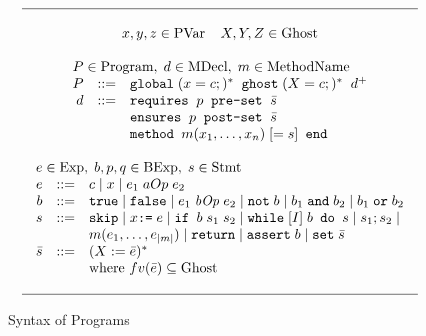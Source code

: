 \begin{figure}[tbp]
\begin{displaymath}
\begin{array}{c}
\hline
\ \\
x,y,z \in \textrm{PVar}\;\;\;\; X,Y,Z \in \textrm{Ghost} \\
\ \\
\begin{array}{rcl}
\multicolumn{3}{l}{P \in  \textrm{Program},\;d  \in  \textrm{MDecl},\;m  \in  \textrm{MethodName}}   \\
P & ::= & \texttt{global}\;(x = c;)^*  \;\; \texttt{ghost}\;(X = c;)^* \;\;  d^{+}  \\
d & ::= & \texttt{requires}\;\; p \;\; \texttt{pre-set}\;\; \bar{s}   \\
  &     & \texttt{ensures}\;\; p \;\; \texttt{post-set}\;\; \bar{s} \\
& & \texttt{method } m\textrm{(}x_1,\ldots,x_n)\; [= s] \texttt{ end} 
\end{array} \\
\ \\
\begin{array}{rcl}
\multicolumn{3}{l}{e  \in \textrm{Exp},\; b,p,q  \in  \textrm{BExp},\;s  \in  \textrm{Stmt}  } \\
e & ::= & c \mid x \mid e_1 \;aOp\; e_2     \\  
b & ::= & \texttt{true} \mid \texttt{false} \mid e_1 \;\mathit{bOp}\; e_2 \mid
           \texttt{not}\;b \mid b_1 \;\texttt{and}\; b_2 \mid b_1 \;\texttt{or}\; b_2   \\
s & ::= & \texttt{skip} \mid x \texttt{:=}\; e \mid
         \texttt{if }b\;s_1\;s_2 \mid
        \texttt{while}\;[I]\; b\texttt{ do }s \mid s_1; s_2 \mid \\
 & & m(e_1,\ldots,e_{|m|})  \mid \texttt{return} \mid 
 \texttt{assert}\;b \mid \texttt{set}\;\bar{s} \\
\bar{s} & ::= & (X := \bar{e})^* \\
& &  \mbox{where } fv(\bar{e}) \subseteq \textrm{Ghost} \\
\end{array} \\
\ \\
\hline
\end{array}
\end{displaymath}
\caption{Syntax of Programs}\label{fig:syntax}
\end{figure}